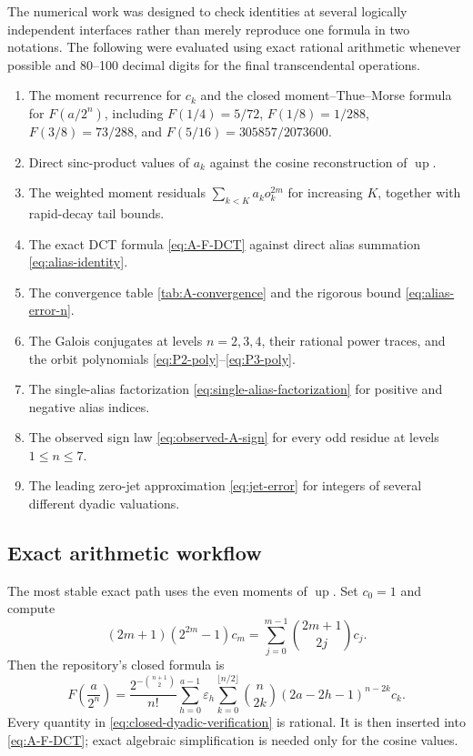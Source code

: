 \documentclass[11pt,oneside]{article}
\theoremstyle{definition}
\theoremstyle{remark}
\newcommand{\Up}{\operatorname{up}}
\newcommand{\eps}{\varepsilon}
\begin{document}
The numerical work was designed to check identities at several logically
independent interfaces rather than merely reproduce one formula in two notations.
The following were evaluated using exact rational arithmetic whenever possible
and 80--100 decimal digits for the final transcendental operations.
\begin{enumerate}
 \item The moment recurrence for $c_k$ and the closed moment--Thue--Morse formula
 for $F(a/2^n)$, including
 $F(1/4)=5/72$, $F(1/8)=1/288$,
 $F(3/8)=73/288$, and
 $F(5/16)=305857/2073600$.
 \item Direct sinc-product values of $a_k$ against the cosine reconstruction of
 $\Up$.
 \item The weighted moment residuals
 $\sum_{k<K}a_ko_k^{2m}$ for increasing $K$, together with rapid-decay tail
 bounds.
 \item The exact DCT formula \eqref{eq:A-F-DCT} against direct alias summation
 \eqref{eq:alias-identity}.
 \item The convergence table \cref{tab:A-convergence} and the rigorous bound
 \eqref{eq:alias-error-n}.
 \item The Galois conjugates at levels $n=2,3,4$, their rational power traces,
 and the orbit polynomials \eqref{eq:P2-poly}--\eqref{eq:P3-poly}.
 \item The single-alias factorization \eqref{eq:single-alias-factorization} for
 positive and negative alias indices.
 \item The observed sign law \eqref{eq:observed-A-sign} for every odd residue at
 levels $1\le n\le7$.
 \item The leading zero-jet approximation \eqref{eq:jet-error} for integers of
 several different dyadic valuations.
\end{enumerate}

\subsection{Exact arithmetic workflow}

The most stable exact path uses the even moments of $\Up$.  Set $c_0=1$ and
compute
\begin{equation}\label{eq:c-recurrence-verification}
 (2m+1)(2^{2m}-1)c_m
 =\sum_{j=0}^{m-1}\binom{2m+1}{2j}c_j.
\end{equation}
Then the repository's closed formula is
\begin{equation}\label{eq:closed-dyadic-verification}
 F\!\left(\frac a{2^n}\right)
 =\frac{2^{-\binom{n+1}{2}}}{n!}
 \sum_{h=0}^{a-1}\eps_h
 \sum_{k=0}^{\lfloor n/2\rfloor}
 \binom n{2k}(2a-2h-1)^{n-2k}c_k.
\end{equation}
Every quantity in \eqref{eq:closed-dyadic-verification} is rational.  It is
then inserted into \eqref{eq:A-F-DCT}; exact algebraic simplification is needed
only for the cosine values.
\end{document}
